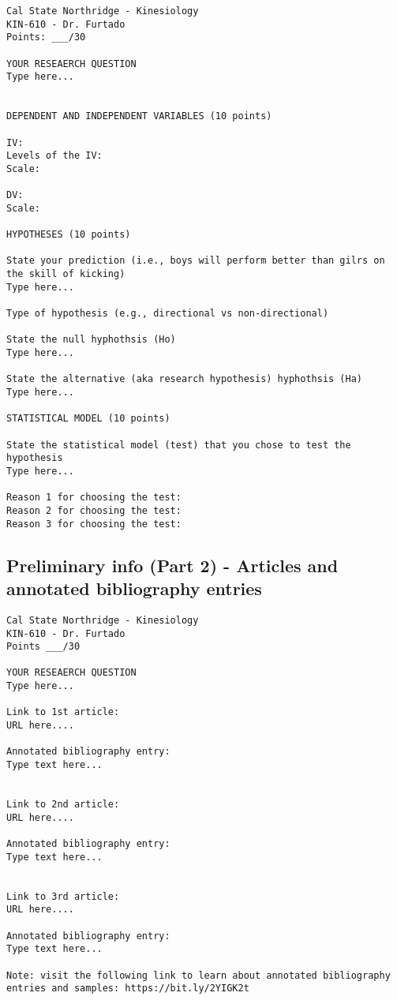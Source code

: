 \documentclass[
]{article}
\begin{document}
\begin{verbatim}
Cal State Northridge - Kinesiology
KIN-610 - Dr. Furtado
Points: ___/30

YOUR RESEAERCH QUESTION
Type here...


DEPENDENT AND INDEPENDENT VARIABLES (10 points)

IV: 
Levels of the IV:
Scale:

DV:
Scale:

HYPOTHESES (10 points)

State your prediction (i.e., boys will perform better than gilrs on the skill of kicking)
Type here...

Type of hypothesis (e.g., directional vs non-directional)

State the null hyphothsis (Ho)
Type here...

State the alternative (aka research hypothesis) hyphothsis (Ha)
Type here...

STATISTICAL MODEL (10 points)

State the statistical model (test) that you chose to test the hypothesis
Type here...

Reason 1 for choosing the test:
Reason 2 for choosing the test:
Reason 3 for choosing the test:
\end{verbatim}

\hypertarget{preliminary-info-part-2---articles-and-annotated-bibliography-entries}{%
\subsection{Preliminary info (Part 2) - Articles and annotated bibliography entries}\label{preliminary-info-part-2---articles-and-annotated-bibliography-entries}}

\begin{verbatim}
Cal State Northridge - Kinesiology
KIN-610 - Dr. Furtado
Points ___/30

YOUR RESEAERCH QUESTION
Type here...

Link to 1st article:
URL here....

Annotated bibliography entry:
Type text here...


Link to 2nd article:
URL here....

Annotated bibliography entry:
Type text here...


Link to 3rd article:
URL here....

Annotated bibliography entry:
Type text here...

Note: visit the following link to learn about annotated bibliography
entries and samples: https://bit.ly/2YIGK2t
\end{verbatim}
\end{document}
